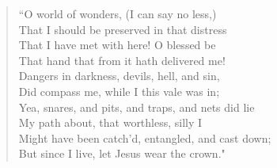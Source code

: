 \begin{verse} 
``O world of wonders, (I can say no less,)\\
That I should be preserved in that distress\\
That I have met with here! O blessed be\\
That hand that from it hath delivered me!\\
Dangers in darkness, devils, hell, and sin,\\
Did compass me, while I this vale was in;\\
Yea, snares, and pits, and traps, and nets did lie\\
My path about, that worthless, silly I\\
Might have been catch'd, entangled, and cast down;\\
But since I live, let Jesus wear the crown."\\
\end{verse} 
